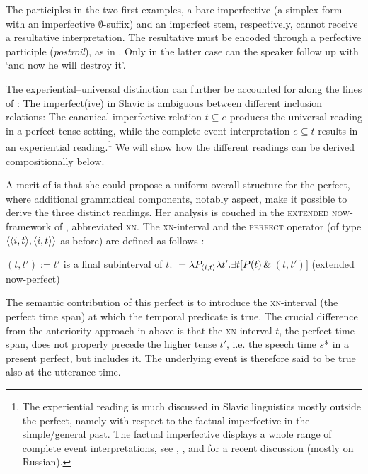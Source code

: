 \documentclass[output=paper,colorlinks,citecolor=brown]{langscibook}
\begin{document}
\noindent The participles in the two first examples, a bare imperfective (a simplex form with an imperfective $\emptyset$-suffix) and an imperfect stem, respectively, cannot receive a resultative interpretation. The resultative must be encoded through a perfective participle ({\textit{postroil}}), as in . Only in the latter case can the speaker follow up with `and now he will destroy it'.

The experiential--universal distinction can further be accounted for along the lines of \citet{gronndiss}:  The imperfect(ive) in Slavic is ambiguous between different inclusion relations: The canonical imperfective relation $t \subseteq e$ produces the universal reading in a perfect tense setting, while the complete event interpretation $e \subseteq t$ results in an experiential reading.\footnote{The experiential reading is much discussed in Slavic linguistics mostly outside the perfect, namely with respect to the factual imperfective in the simple/general past. The factual imperfective displays a whole range of complete event interpretations, see \citet{Groenn2015}, , and  for a recent discussion (mostly on Russian).} We will show how the different readings can be derived compositionally below.

A merit of \citet{pancheva03} is that she could propose a uniform overall structure for the perfect, where  additional grammatical components, notably aspect, make it possible to derive the three distinct readings. Her analysis is 
 couched in the \textsc{extended now}-framework of \citet{Dowty1979}, abbreviated \textsc{xn}.
The \textsc{xn}-interval and the \textsc{perfect} operator (of type $\langle{\langle{i,t}\rangle,\langle{i,t}\rangle}\rangle$ as before) are defined as follows \citep{gronn_stechow2020}:

\ea\ea
{}$(t,t'):=t'$ is a final subinterval of $t$.
\ex\label{xndef} ${}=\lambda P_{\langle{i,t}\rangle} \lambda t'. \exists t[P(t) \, \& \, $$(t,t')]$ \hfill  (extended now-perfect) 
\z\z

\largerpage
The semantic contribution of this perfect is  to introduce the \textsc{xn}-interval
(the perfect time span) at which the temporal predicate is true.
 The crucial difference from  the anteriority approach in 
above is that the \textsc{xn}-interval $t$, the perfect time span, does not properly precede the higher
tense $t'$, i.e. the speech time $s$* in a present perfect, but includes it. The underlying event is therefore said to be true also at the utterance time.
\end{document}

